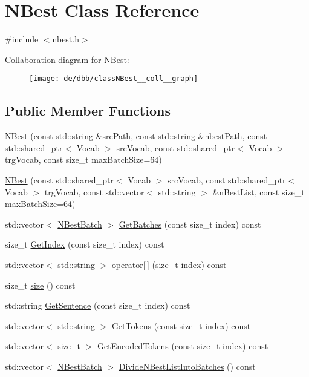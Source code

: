 \hypertarget{classNBest}{}\section{N\+Best Class Reference}
\label{classNBest}


{\ttfamily \#include $<$nbest.\+h$>$}



Collaboration diagram for N\+Best\+:
\nopagebreak
\begin{figure}[H]
\begin{center}
\leavevmode
\texttt{[image: de/dbb/classNBest\_\_coll\_\_graph]}
\end{center}
\end{figure}
\subsection*{Public Member Functions}
\begin{DoxyCompactItemize}
\item 
\hyperlink{classNBest_a6814af86036fd1dfe88fc8639c639e6f}{N\+Best} (const std\+::string \&src\+Path, const std\+::string \&nbest\+Path, const std\+::shared\+\_\+ptr$<$ Vocab $>$ src\+Vocab, const std\+::shared\+\_\+ptr$<$ Vocab $>$ trg\+Vocab, const size\+\_\+t max\+Batch\+Size=64)
\item 
\hyperlink{classNBest_a4f7be459bdb936d76d60afc47eded253}{N\+Best} (const std\+::shared\+\_\+ptr$<$ Vocab $>$ src\+Vocab, const std\+::shared\+\_\+ptr$<$ Vocab $>$ trg\+Vocab, const std\+::vector$<$ std\+::string $>$ \&n\+Best\+List, const size\+\_\+t max\+Batch\+Size=64)
\item 
std\+::vector$<$ \hyperlink{nbest_8h_acb6b6f07cf7c4a3fe5820acf1a965584}{N\+Best\+Batch} $>$ \hyperlink{classNBest_ad66c17c11f48f88e6ea1a55e200efdaa}{Get\+Batches} (const size\+\_\+t index) const 
\item 
size\+\_\+t \hyperlink{classNBest_a0e3c5f0a2e750a4e03fe684d93da216d}{Get\+Index} (const size\+\_\+t index) const 
\item 
std\+::vector$<$ std\+::string $>$ \hyperlink{classNBest_ae9cb5e867610b333f991f07981279ec2}{operator\mbox{[}$\,$\mbox{]}} (size\+\_\+t index) const 
\item 
size\+\_\+t \hyperlink{classNBest_a7c0e484c776c65e44e65034cf5127234}{size} () const 
\item 
std\+::string \hyperlink{classNBest_a8f4ea909cf3d0083c058ffb4d315c4f0}{Get\+Sentence} (const size\+\_\+t index) const 
\item 
std\+::vector$<$ std\+::string $>$ \hyperlink{classNBest_a655136ec5cf258b827ad7113adba62d3}{Get\+Tokens} (const size\+\_\+t index) const 
\item 
std\+::vector$<$ size\+\_\+t $>$ \hyperlink{classNBest_a3d5b1d94acb0f6f23ff754c35e1d5a17}{Get\+Encoded\+Tokens} (const size\+\_\+t index) const 
\item 
std\+::vector$<$ \hyperlink{nbest_8h_acb6b6f07cf7c4a3fe5820acf1a965584}{N\+Best\+Batch} $>$ \hyperlink{classNBest_a4f9908d927e5312228e65eaeee451ec3}{Divide\+N\+Best\+List\+Into\+Batches} () const 
\end{DoxyCompactItemize}
